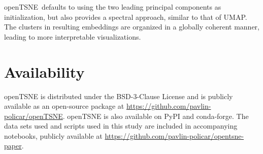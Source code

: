 \documentclass[twocolumn]{bmcart}
\newcommand{\opentsne}{\textsf{openTSNE}}
\begin{document}
\opentsne\ defaults to using the two leading principal components as
initialization, but also provides a spectral approach, similar to that of UMAP.
The clusters in resulting embeddings are organized in a globally coherent
manner, leading to more interpretable visualizations.

\section*{Availability}

openTSNE is distributed under the BSD-3-Clause License and is publicly
available as an open-source package at
\url{https://github.com/pavlin-policar/openTSNE}. openTSNE is also available on
PyPI and conda-forge. The data sets used and scripts used in this study are
included in accompanying notebooks, publicly available at
\url{https://github.com/pavlin-policar/opentsne-paper}.

\end{document}
